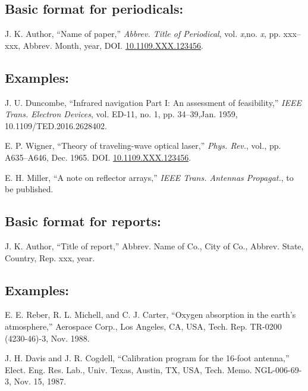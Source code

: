\documentclass[12pt,conference]{IEEEtran}
\begin{document}
\subsection*{Basic format for periodicals:}\vspace*{-12pt}

\begin{thebibliography}{34}
\item[]
J. K. Author, ``Name of paper,'' {\it Abbrev. Title of Periodical}, vol. {\it x},\break   no. {\it x}, pp. xxx--xxx, Abbrev. Month, year, DOI. \href{https://dx.doi.org/10.1109.XXX.123456}{10.1109.XXX.123456}.
\end{thebibliography}


\subsection*{Examples:}\vspace*{-12pt}

\begin{thebibliography}{34}
\setcounter{enumiv}{2}

\bibitem{}J. U. Duncombe, ``Infrared navigation Part I: An assessment of feasibility,'' {\em IEEE Trans. Electron Devices}, vol. ED-11, no. 1, pp. 34--39,\break Jan. 1959, 10.1109/TED.2016.2628402.

\bibitem{}E. P. Wigner, ``Theory of traveling-wave optical laser,''
{\em Phys. Rev.},  vol., pp. A635--A646, Dec. 1965. DOI. \href{https://dx.doi.org/10.1109.XXX.123456}{10.1109.XXX.123456}.

\bibitem{}E. H. Miller, ``A note on reflector arrays,'' {\em IEEE Trans. Antennas Propagat.}, to be published.
\end{thebibliography}


\subsection*{Basic format for reports:}\vspace*{-12pt}
\begin{thebibliography}{34}
\item[]
J. K. Author, ``Title of report,'' Abbrev. Name of Co., City of Co., Abbrev. State, Country, Rep. xxx, year.
\end{thebibliography}

\subsection*{Examples:}\vspace*{-12pt}
\begin{thebibliography}{34}
\setcounter{enumiv}{5}

\bibitem{} E. E. Reber, R. L. Michell, and C. J. Carter, ``Oxygen absorption in the earth’s atmosphere,'' Aerospace Corp., Los Angeles, CA, USA, Tech. Rep. TR-0200 (4230-46)-3, Nov. 1988.

\bibitem{} J. H. Davis and J. R. Cogdell, ``Calibration program for the 16-foot antenna,'' Elect. Eng. Res. Lab., Univ. Texas, Austin, TX, USA, Tech. Memo. NGL-006-69-3, Nov. 15, 1987.
\end{thebibliography}
\end{document}

